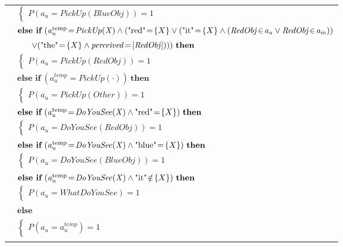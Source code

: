 \begin{footnotesize}
\begin{longtable}{p{1cm}l}
& \;\;\;\;\; $ \begin{cases}P(\mathit{a_u}\!=\!\mathit{PickUp(BlueObj)})\!=\!1 \end{cases}$ \vspace{1mm} \\ & $ \textbf{else if} \ (\mathit{a_u^{\text{temp}}}\!=\!\mathit{PickUp({X})} \land (\text{"red"}\!=\!\mathit\{X\} \lor (\text{"it"}\!=\!\mathit\{X\} \land (\mathit{RedObj}\!\in\!\mathit{a_u} \lor \mathit{RedObj}\!\in\!\mathit{a_m})) $ \\ & $\ \ \ \ \  \lor (\text{"the"}\!=\!\mathit\{X\} \land \mathit{perceived}\!=\![\mathit{RedObj}]))) \ \textbf{then}$ \\
& \;\;\;\;\; $ \begin{cases}P(\mathit{a_u}\!=\!\mathit{PickUp(RedObj)})\!=\!1 \end{cases}$ \vspace{1mm} \\ & $ \textbf{else if} \ (\mathit{a_u^{\text{temp}}}\!=\!\mathit{PickUp(\cdot)}) \ \textbf{then}$ \\
& \;\;\;\;\; $ \begin{cases}P(\mathit{a_u}\!=\!\mathit{PickUp(Other)})\!=\!1 \end{cases}$ \vspace{1mm} \\ & $ \textbf{else if} \ (\mathit{a_u^{\text{temp}}}\!=\!\mathit{DoYouSee({X})} \land \text{"red"}\!=\!\mathit\{X\}) \ \textbf{then}$ \\
& \;\;\;\;\; $ \begin{cases}P(\mathit{a_u}\!=\!\mathit{DoYouSee(RedObj)})\!=\!1 \end{cases}$ \vspace{1mm} \\ & $ \textbf{else if} \ (\mathit{a_u^{\text{temp}}}\!=\!\mathit{DoYouSee({X})} \land \text{"blue"}\!=\!\mathit\{X\}) \ \textbf{then}$ \\
& \;\;\;\;\; $ \begin{cases}P(\mathit{a_u}\!=\!\mathit{DoYouSee(BlueObj)})\!=\!1 \end{cases}$ \vspace{1mm} \\ & $ \textbf{else if} \ (\mathit{a_u^{\text{temp}}}\!=\!\mathit{DoYouSee({X})} \land \text{"it"}\!\notin\!\mathit\{X\}) \ \textbf{then}$ \\
& \;\;\;\;\; $ \begin{cases}P(\mathit{a_u}\!=\!\mathit{WhatDoYouSee})\!=\!1 \end{cases}$ \vspace{1mm} \\ & $ \textbf{else}$ \\
& \;\;\;\;\; $ \begin{cases}P(\mathit{a_u}\!=\!\mathit{{a_u^{\text{temp}}}})\!=\!1 \end{cases}$ \\ \\[-1mm]
\end{longtable}
\end{footnotesize}

